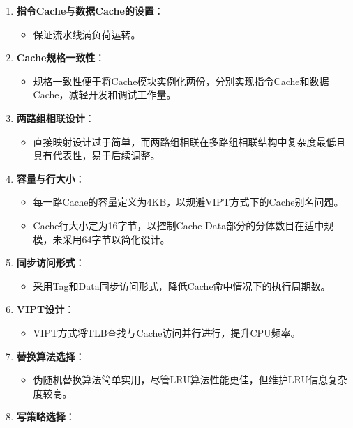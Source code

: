 \begin{enumerate}
\def\labelenumi{\arabic{enumi}.}
\tightlist
\item
  \textbf{指令Cache与数据Cache的设置}：

  \begin{itemize}
  \tightlist
  \item
    保证流水线满负荷运转。
  \end{itemize}
\item
  \textbf{Cache规格一致性}：

  \begin{itemize}
  \tightlist
  \item
    规格一致性便于将Cache模块实例化两份，分别实现指令Cache和数据Cache，减轻开发和调试工作量。
  \end{itemize}
\item
  \textbf{两路组相联设计}：

  \begin{itemize}
  \tightlist
  \item
    直接映射设计过于简单，而两路组相联在多路组相联结构中复杂度最低且具有代表性，易于后续调整。
  \end{itemize}
\item
  \textbf{容量与行大小}：

  \begin{itemize}
  \tightlist
  \item
    每一路Cache的容量定义为4KB，以规避VIPT方式下的Cache别名问题。
  \item
    Cache行大小定为16字节，以控制Cache Data部分的分体数目在适中规模，未采用64字节以简化设计。
  \end{itemize}
\item
  \textbf{同步访问形式}：

  \begin{itemize}
  \tightlist
  \item
    采用Tag和Data同步访问形式，降低Cache命中情况下的执行周期数。
  \end{itemize}
\item
  \textbf{VIPT设计}：

  \begin{itemize}
  \tightlist
  \item
    VIPT方式将TLB查找与Cache访问并行进行，提升CPU频率。
  \end{itemize}
\item
  \textbf{替换算法选择}：

  \begin{itemize}
  \tightlist
  \item
    伪随机替换算法简单实用，尽管LRU算法性能更佳，但维护LRU信息复杂度较高。
  \end{itemize}
\item
  \textbf{写策略选择}：


\end{enumerate}
